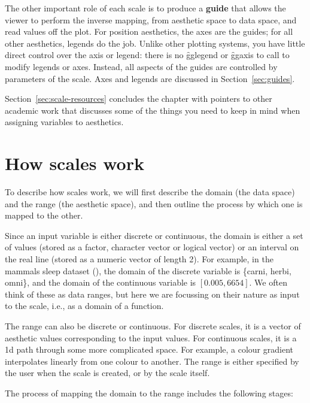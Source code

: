 The other important role of each scale is to produce a {\bf guide} that allows the viewer to perform the inverse mapping, from aesthetic space to data space, and read values off the plot. For position aesthetics, the axes are the guides; for all other aesthetics, legends do the job. Unlike other plotting systems, you have little direct control over the axis or legend: there is no \f{gglegend} or \f{ggaxis} to call to modify legends or axes.  Instead, all aspects of the guides are controlled by parameters of the scale. Axes and legends are discussed in Section~\ref{sec:guides}.


Section~\ref{sec:scale-resources} concludes the chapter with pointers to other academic work that discusses some of the things you need to keep in mind when assigning variables to aesthetics.

\section{How scales work}
\label{sec:how-scales-work}

To describe how scales work, we will first describe the domain (the data space) and the range (the aesthetic space), and then outline the process by which one is mapped to the other.

Since an input variable is either discrete or continuous, the domain is either a set of values (stored as a factor, character vector or logical vector)  or an interval on the real line (stored as a numeric vector of length 2). For example, in the mammals sleep dataset (), the domain of the discrete variable  is \{carni, herbi, omni\}, and the domain of the continuous variable  is $[0.005, 6654]$.  We often think of these as data ranges, but here we are focussing on their nature as input to the scale, i.e., as a domain of a function. 

The range can also be discrete or continuous. For discrete scales, it is a vector of aesthetic values corresponding to the input values. For continuous scales, it is a 1d path through some more complicated space. For example, a colour gradient interpolates linearly from one colour to another. The range is either specified by the user when the scale is created, or by the scale itself.

The process of mapping the domain to the range includes the following stages:

